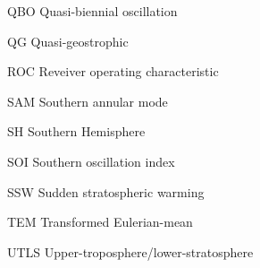 \begin{description*}
\item[QBO] Quasi-biennial oscillation
\item[QG] Quasi-geostrophic
\item[ROC] Reveiver operating characteristic
\item[SAM] Southern annular mode
\item[SH] Southern Hemisphere
\item[SOI] Southern oscillation index
\item[SSW] Sudden stratospheric warming
\item[TEM] Transformed Eulerian-mean
\item[UTLS] Upper-troposphere/lower-stratosphere

\end{description*}



